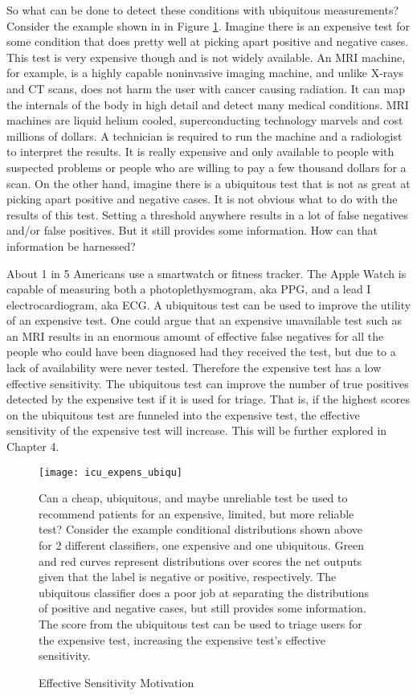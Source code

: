 So what can be done to detect these conditions with ubiquitous measurements?   Consider the example shown in in Figure \ref{fig:icu_expens_ubiqu}.  Imagine there is an expensive test for some condition that does pretty well at picking apart positive and negative cases.  This test is very expensive though and is not widely available.  An MRI machine, for example, is a highly capable noninvasive imaging machine, and unlike X-rays and CT scans, does not harm the user with cancer causing radiation.  It can map the internals of the body in high detail and detect many medical conditions.  MRI machines are liquid helium cooled, superconducting technology marvels and cost millions of dollars.  A technician is required to run the machine and a radiologist to interpret the results.  It is really expensive and only available to people with suspected problems or people who are willing to pay a few thousand dollars for a scan. On the other hand, imagine there is a ubiquitous test that is not as great at picking apart positive and negative cases.  It is not obvious what to do with the results of this test.  Setting a threshold anywhere results in a lot of false negatives and/or false positives. But it still provides some information.  How can that information be harnessed? 

About 1 in 5 Americans use a smartwatch or fitness tracker.  The Apple Watch is capable of measuring both a photoplethysmogram, aka PPG, and a lead I electrocardiogram, aka ECG. A ubiquitous test can be used to improve the utility of an expensive test.  One could argue that an expensive unavailable test such as an MRI results in an enormous amount of effective false negatives for all the people who could have been diagnosed had they received the test, but due to a lack of availability were never tested.  Therefore the expensive test has a low effective sensitivity.  The ubiquitous test can improve the number of true positives detected by the expensive test if it is used for triage.  That is, if the highest scores on the ubiquitous test are funneled into the expensive test, the effective sensitivity of the expensive test will increase.  This will be further explored in Chapter 4.

\begin{figure}[h]
\begin{center}
\texttt{[image: icu\_expens\_ubiqu]}
\end{center}
\caption{Effective Sensitivity Motivation}
\vspace{12px}
Can a cheap, ubiquitous, and maybe unreliable test be used to recommend patients for an expensive, limited, but more reliable test?  Consider the example conditional distributions shown above for 2 different classifiers, one expensive and one ubiquitous.  Green and red curves represent distributions over scores the net outputs given that the label is negative or positive, respectively.  The ubiquitous classifier does a poor job at separating the distributions of positive and negative cases, but still provides some information.  The score from the ubiquitous test can be used to triage users for the expensive test, increasing the expensive test's effective sensitivity.
\label{fig:icu_expens_ubiqu}
\end{figure}

